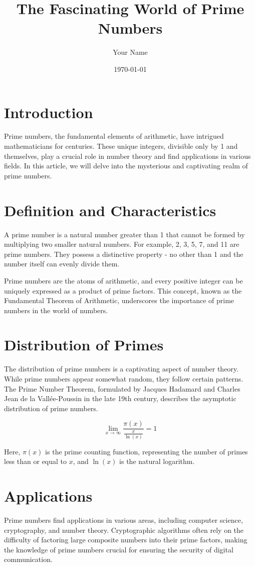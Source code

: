\documentclass{article}
\title{The Fascinating World of Prime Numbers}
\author{Your Name}
\date{\today}
\begin{document}
\maketitle

\section*{Introduction}
Prime numbers, the fundamental elements of arithmetic, have intrigued mathematicians for centuries. These unique integers, divisible only by 1 and themselves, play a crucial role in number theory and find applications in various fields. In this article, we will delve into the mysterious and captivating realm of prime numbers.

\section*{Definition and Characteristics}
A prime number is a natural number greater than 1 that cannot be formed by multiplying two smaller natural numbers. For example, 2, 3, 5, 7, and 11 are prime numbers. They possess a distinctive property - no other than 1 and the number itself can evenly divide them.

Prime numbers are the atoms of arithmetic, and every positive integer can be uniquely expressed as a product of prime factors. This concept, known as the Fundamental Theorem of Arithmetic, underscores the importance of prime numbers in the world of numbers.

\section*{Distribution of Primes}
The distribution of prime numbers is a captivating aspect of number theory. While prime numbers appear somewhat random, they follow certain patterns. The Prime Number Theorem, formulated by Jacques Hadamard and Charles Jean de la Vallée-Poussin in the late 19th century, describes the asymptotic distribution of prime numbers.

\begin{equation}
\lim_{x \to \infty} \frac{\pi(x)}{\frac{x}{\ln(x)}} = 1
\end{equation}

Here, $\pi(x)$ is the prime counting function, representing the number of primes less than or equal to $x$, and $\ln(x)$ is the natural logarithm.

\section*{Applications}
Prime numbers find applications in various areas, including computer science, cryptography, and number theory. Cryptographic algorithms often rely on the difficulty of factoring large composite numbers into their prime factors, making the knowledge of prime numbers crucial for ensuring the security of digital communication.
\end{document}
